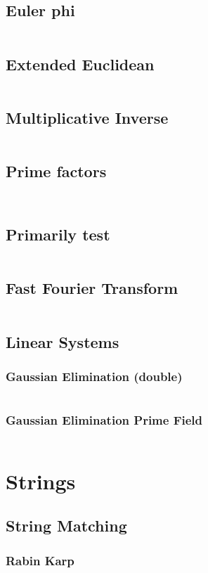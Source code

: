 \documentclass[a4paper, 10pt, twocolumn, landscape]{article}
\begin{document}
  \subsection{Euler phi}
  \inputminted{cpp}{math/euler-phi.cpp}
  \subsection{Extended Euclidean}
  \inputminted{cpp}{math/extended-euclid.cpp}
  \subsection{Multiplicative Inverse}
  \inputminted{cpp}{math/mult-inverse.cpp}
  \subsection{Prime factors}
  \inputminted{cpp}{math/prime-factors.cpp}
  \inputminted{cpp}{math/pollard-rho.cpp}
  \subsection{Primarily test}
  \inputminted{cpp}{math/miller-rabin.cpp}
  \subsection{Fast Fourier Transform}
  \inputminted{cpp}{math/fft.cpp}
  \subsection{Linear Systems}
  \subsubsection{Gaussian Elimination (double)}
  \inputminted{cpp}{math/gauss-elim.cpp}
  \subsubsection{Gaussian Elimination Prime Field}
  \inputminted{cpp}{math/gauss-elim-prime.cpp}

  
  \section{Strings}
  \subsection{String Matching}
  \subsubsection{Rabin Karp}
  \inputminted{cpp}{strings/rabin-karp.cpp}
\end{document}
